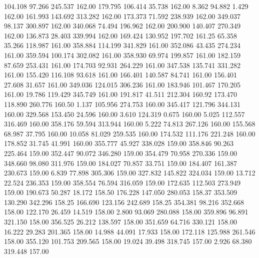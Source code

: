  104.108   97.266  245.537       162.00
 179.795  106.414   35.738       162.00
   8.362   94.882    1.429       162.00
 161.993  143.692  313.282       162.00
 173.373   71.592  238.939       162.00
 349.037   98.137  300.897       162.00
 340.068   74.494  196.962       162.00
 200.900  140.407  270.349       162.00
 136.873   28.403  339.994       162.00
 169.424  130.952  197.702       161.25
  65.358   35.266  118.987       161.00
 358.884  114.199  341.829       161.00
 352.086   43.435  274.234       161.00
 359.594  100.174  302.082       161.00
 358.930   69.974  199.857       161.00
 182.159   87.659  253.431       161.00
 174.703   92.931  264.229       161.00
 347.538  135.741  331.282       161.00
 155.420  116.108   93.618       161.00
 166.401  140.587   84.741       161.00
 156.401   27.608   31.657       161.00
 349.036  124.015  306.236       161.00
 183.946  101.467  170.205       161.00
  19.786  119.429  345.749       161.00
 191.817   41.511  212.304       160.92
 173.470  118.890  260.776       160.50
   1.137  105.956  274.753       160.00
 345.417  121.796  344.131       160.00
 329.568  153.450   24.596       160.00
   3.610  124.319    0.675       160.00
   5.025  112.557  316.469       160.00
 358.176   59.594  313.944       160.00
   5.222   74.813  267.126       160.00
 155.568   68.987   37.795       160.00
  10.058   81.029  259.535       160.00
 174.532  111.176  221.248       160.00
 178.852   31.745   41.991       160.00
 355.777   45.927  338.028       159.00
 358.846   90.263  225.464       159.00
 352.447   90.072  346.280       159.00
 354.479   70.958  270.336       159.00
 348.660   98.080  311.976       159.00
 184.027   70.857   33.751       159.00
 184.407  161.387  230.673       159.00
   6.839   77.898  305.306       159.00
 327.832  145.822  324.034       159.00
  13.712   22.524  236.353       159.00
 358.554   76.594  316.059       159.00
 172.635  112.503  273.949       159.00
 190.673   50.287   18.172       158.50
 176.228  147.050  280.053       158.37
 353.509  130.290  342.296       158.25
 166.690  123.156  242.689       158.25
 354.381   98.216  352.668       158.00
 122.170   26.459   14.519       158.00
   2.800   93.069  280.088       158.00
 359.896   96.891  321.150       158.00
 356.525   26.212  138.597       158.00
 351.659   64.716  330.121       158.00
  16.222   29.283  201.365       158.00
  14.988   44.091   17.933       158.00
 172.118  125.988  261.546       158.00
 355.120  101.753  209.565       158.00
  19.024   39.498  318.745       157.00
   2.926   68.380  319.448       157.00
